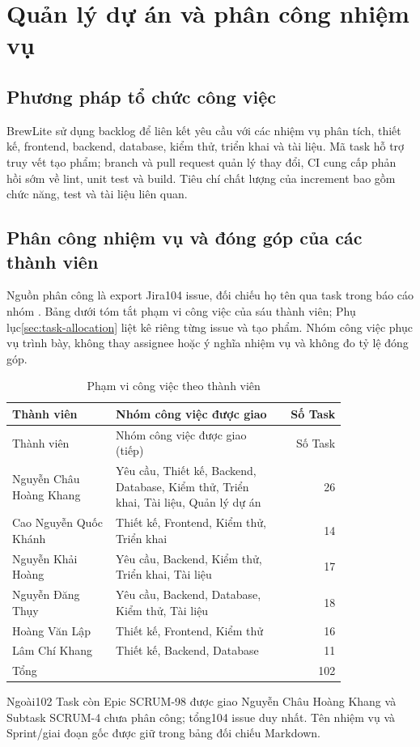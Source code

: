 \section{Quản lý dự án và phân công nhiệm vụ}
\label{sec:scrum}
\subsection{Phương pháp tổ chức công việc}
BrewLite sử dụng backlog để liên kết yêu cầu với các nhiệm vụ phân tích,
thiết kế, frontend, backend, database, kiểm thử, triển khai và tài liệu.
Mã task hỗ trợ truy vết tạo phẩm; branch và pull request quản lý thay đổi,
CI cung cấp phản hồi sớm về lint, unit test và build. Tiêu chí chất lượng
của increment bao gồm chức năng, test và tài liệu liên quan.

\subsection{Phân công nhiệm vụ và đóng góp của các thành viên}
Nguồn phân công là export Jira104 issue, đối chiếu họ tên qua task trong
báo cáo nhóm \cite{a1report}. Bảng dưới tóm tắt phạm vi công việc của sáu thành viên;
Phụ lục\ref{sec:task-allocation} liệt kê riêng từng issue và tạo phẩm. Nhóm công việc
phục vụ trình bày, không thay assignee hoặc ý nghĩa nhiệm vụ và không đo tỷ lệ đóng góp.

\begin{longtable}{>{\raggedright\arraybackslash}p{0.31\linewidth}>{\raggedright\arraybackslash}p{0.51\linewidth}r}
\caption{Phạm vi công việc theo thành viên}\label{tab:allocation-summary}\\
\toprule Thành viên & Nhóm công việc được giao & Số Task \\ \midrule\endfirsthead
\toprule Thành viên & Nhóm công việc được giao (tiếp) & Số Task \\ \midrule\endhead
Nguyễn Châu Hoàng Khang & Yêu cầu, Thiết kế, Backend, Database, Kiểm thử, Triển khai, Tài liệu, Quản lý dự án & 26 \\
Cao Nguyễn Quốc Khánh & Thiết kế, Frontend, Kiểm thử, Triển khai & 14 \\
Nguyễn Khải Hoàng & Yêu cầu, Backend, Kiểm thử, Triển khai, Tài liệu & 17 \\
Nguyễn Đăng Thụy & Yêu cầu, Backend, Database, Kiểm thử, Tài liệu & 18 \\
Hoàng Văn Lập & Thiết kế, Frontend, Kiểm thử & 16 \\
Lâm Chí Khang & Thiết kế, Backend, Database & 11 \\
\midrule Tổng & &102\\\bottomrule\end{longtable}
Ngoài102 Task còn Epic SCRUM-98 được giao Nguyễn Châu Hoàng Khang và
Subtask SCRUM-4 chưa phân công; tổng104 issue duy nhất. Tên nhiệm vụ và
Sprint/giai đoạn gốc được giữ trong bảng đối chiếu Markdown.

